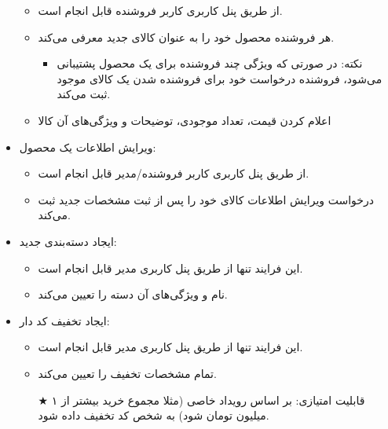 \documentclass[]{article}
\begin{document}
\begin{itemize}
\begin{itemize}
\item
از طریق پنل کاربری کاربر فروشنده قابل انجام است.

\item
هر فروشنده محصول خود را به عنوان کالای جدید معرفی می‌کند.

\begin{itemize}[label={$\blacksquare$}]
\item
نکته:‌ در صورتی که ویژگی چند فروشنده برای یک محصول پشتیبانی می‌شود، فروشنده درخواست خود برای فروشنده شدن یک کالای موجود ثبت می‌کند.
\end{itemize}

\item
اعلام کردن قیمت، تعداد موجودی، توضیحات و ویژگی‌های آن کالا

\end{itemize}
\item
ویرایش اطلاعات یک محصول:

\begin{itemize}

\item
از طریق پنل کاربری کاربر فروشنده/مدیر قابل انجام است.

\item
درخواست ویرایش اطلاعات کالای خود را پس از ثبت مشخصات جدید ثبت می‌کند.
\end{itemize}

\newpage

\item
ایجاد دسته‌بندی جدید:

\begin{itemize}

\item
این فرایند تنها از طریق پنل کاربری مدیر قابل انجام است.

\item
نام و ویژگی‌های آن دسته را تعیین می‌کند.

\end{itemize}
\item
ایجاد تخفیف کد دار:

\begin{itemize}

\item
این فرایند تنها از طریق پنل کاربری مدیر قابل انجام است.

\item
تمام مشخصات تخفیف را تعیین می‌کند.

\item[{$\bigstar$}]
قابلیت امتیازی: بر اساس رویداد خاصی (مثلا مجموع خرید بیشتر از ۱ میلیون تومان شود) به شخص کد تخفیف داده‌ شود.


\end{itemize}
\end{itemize}
\end{document}
